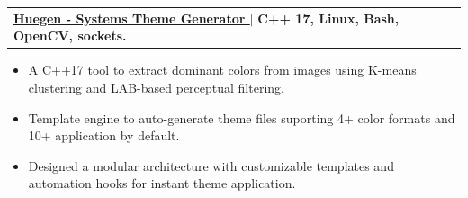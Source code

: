 \documentclass[letterpaper,10pt]{article}
\makeatletter
\newcommand{\resumeItem}[1]{\item[$\bullet$]\small{#1 \vspace{-2pt}}}
\newcommand{\resumeProjectHeading}[4]{
  \item
    \begin{tabular*}{0.97\textwidth}{l@{\extracolsep{\fill}}r}
      \small\textbf{\href{#2}{#1}} $|$  \textbf{#3} & \textit{#4} \\
    \end{tabular*}\vspace{-3pt}
}
\newcommand{\resumeItemListStart}{\begin{itemize}}
\newcommand{\resumeItemListEnd}{\end{itemize}\vspace{-5pt}}
\makeatother
\begin{document}

\resumeProjectHeading
  {Huegen - Systems Theme Generator }{https://github.com/ashish-kus/Huegen}{ C++ 17, Linux, Bash, OpenCV, sockets.}{}
    \resumeItemListStart
        \resumeItem{A C++17 tool to extract dominant colors from images using K-means clustering and LAB-based perceptual filtering.}
        \resumeItem{Template engine to auto-generate theme files suporting 4+ color formats and 10+ application by default.}
        \resumeItem{Designed a modular architecture with customizable templates and automation hooks for instant theme application.}
    \resumeItemListEnd
\end{document}

